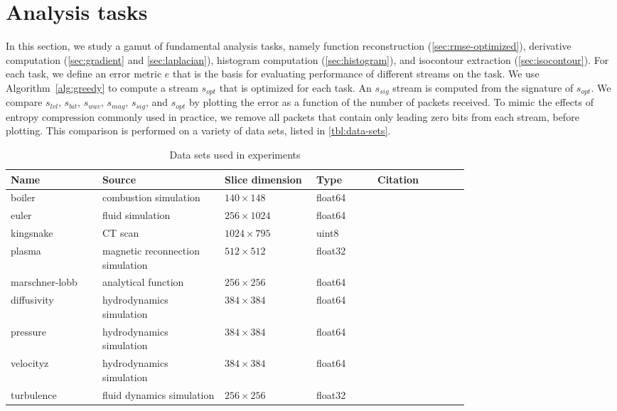 \section{Analysis tasks}\label{sec:analysis-tasks}

In this section, we study a gamut of fundamental analysis tasks, namely function reconstruction
(\autoref{sec:rmse-optimized}), derivative computation (\autoref{sec:gradient} and
\autoref{sec:laplacian}), histogram computation (\autoref{sec:histogram}), and isocontour extraction
(\autoref{sec:isocontour}). For each task, we define an error metric $e$ that is the basis for
evaluating performance of different streams on the task. We use Algorithm~\ref{alg:greedy} to
compute a stream $s_{opt}$ that is optimized for each task. An $s_{sig}$ stream is computed from the
signature of $s_{opt}$. We compare $s_{lvl}$, $s_{bit}$, $s_{wav}$, $s_{mag}$, $s_{sig}$, and
$s_{opt}$ by plotting the error as a function of the number of packets received. To mimic the
effects of entropy compression commonly used in practice, we remove all packets that contain only
leading zero bits from each stream, before plotting. This comparison is performed on a variety of
data sets, listed in \autoref{tbl:data-sets}. 

\begin{table*}[t]
  \caption{Data sets used in experiments }
  \centering
  \begin{tabular}{p{0.15\linewidth}p{0.20\linewidth}p{0.15\linewidth}p{0.10\linewidth}p{0.15\linewidth}}
  \hline
  Name & Source & Slice dimension & Type & Citation\\
  \hline
  boiler & combustion simulation& $140\times 148$ & float64 &\\
  euler & fluid simulation& $256\times 1024$ & float64 &\\
  kingsnake & CT scan & $1024\times 795$ & uint8 &\\
  plasma & magnetic reconnection simulation& $512\times 512$ & float32 &\\
  marschner-lobb & analytical function& $256\times 256$ & float64 &\\
  diffusivity & hydrodynamics simulation& $384\times 384$ & float64 &\\
  pressure & hydrodynamics simulation& $384\times 384$ & float64 &\\
  velocityz & hydrodynamics simulation& $384\times 384$ & float64 &\\
  turbulence & fluid dynamics simulation& $256\times 256$ & float32 &\\
  \hline
  \end{tabular}\label{tbl:data-sets}
\end{table*}

